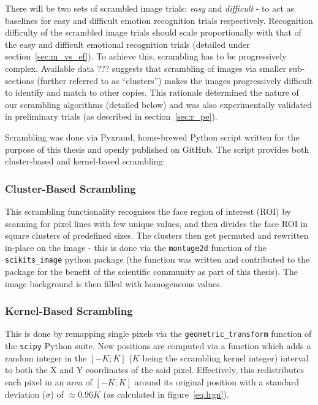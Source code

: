 	There will be two sets of scrambled image trials: \textit{easy} and \textit{difficult} - to act as baselines for easy and difficult emotion recognition trials respectively.
	Recognition difficulty of the scrambled image trials should scale proportionally with that of the easy and difficult emotional recognition trials (detailed under section~\ref{sec:m_vs_ef}).
	To achieve this, scrambling has to be progressively complex.
	Available data ??? suggests that scrambling of images via smaller sub-sections (further referred to as “clusters”) makes the images progressively difficult to identify and match to other copies.
	This rationale determined the nature of our scrambling algorithms (detailed below) and was also experimentally validated in preliminary trials (as described in section~\ref{sec:r_pe}).
	
	Scrambling was done via Pyxrand\cite{pyxrand}, home-brewed Python script written for the purpose of this thesis and openly published on GitHub.
	The script provides both cluster-based and kernel-based scrambling:
	    \subsubsection{Cluster-Based Scrambling}
	    This scrambling functionality recognises the face region of interest (ROI) by scanning for pixel lines with few unique values, and then divides the face ROI in square clusters of predefined sizes.
	    The clusters then get permuted and rewritten in-place on the image - this is done via the \colorbox{vlg}{\texttt{montage2d}} function of the \colorbox{vlg}{\texttt{scikits\_image}} python package 
	    (the function was written and contributed to the package for the benefit of the scientific community as part of this thesis).
	    The image background is then filled with homogeneous values.
	    \subsubsection{Kernel-Based Scrambling}\label{sec:m_vs_si_kbs}
	    This is done by remapping single pixels via the \colorbox{vlg}{\texttt{geometric\_transform}} function of the \colorbox{vlg}{\texttt{scipy}} Python suite. 
	    New positions are computed via a function which adds a random integer in the $[-K;K]$ ($K$ being the scrambling kernel integer) interval to both the X and Y coordinates of the said pixel.
	    Effectively, this redistributes each pixel in an area of $[-K;K]$ around its original position with a standard deviation ($\sigma$) of $\approx 0.96K$ (as calculated in figure~\ref{eq:lrgn}). 
